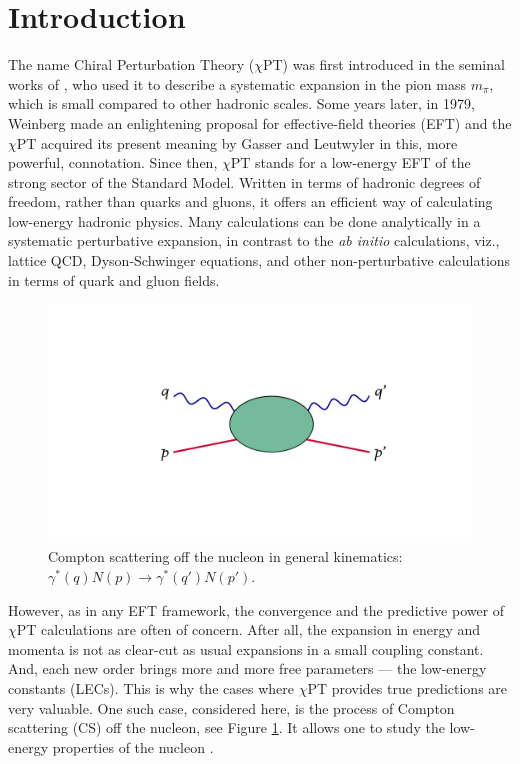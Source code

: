 \documentclass[preprints,review,accept,moreauthors,pdftex]{Definitions/mdpi}
\begin{document}
\section{Introduction}



The name Chiral Perturbation Theory ($\chi$PT) was first introduced in the seminal works of \citet{Pagels:1974se}, who used
it to describe a systematic expansion in the pion mass
$m_\pi$, which is small compared to other hadronic scales.
Some years later, in 1979, Weinberg \cite{Weinberg:1978kz} made an enlightening  proposal for effective-field theories (EFT) and
the $\chi$PT acquired its present meaning by Gasser and Leutwyler  \cite{Gasser:1983yg,Gasser:1987rb} in this, more powerful, connotation. Since then, $\chi$PT stands for a low-energy EFT of the strong sector of the Standard Model. Written in terms of hadronic degrees of freedom, rather than quarks and gluons, it offers
an efficient way of calculating low-energy hadronic physics. 
Many calculations can be done analytically in a systematic perturbative expansion, in contrast 
to the \textit{ab initio} calculations, viz., lattice QCD, Dyson-Schwinger equations, and other non-perturbative
calculations in terms of quark and gluon fields.  

\begin{figure}[t]
\centering
\includegraphics[width=5 cm]{Figures/newCSfigure.pdf}
\caption{Compton scattering off the nucleon in general kinematics: $\gamma^*(q) N(p) \rightarrow \gamma^*(q') N(p')$. \label{CSfigure}}
\end{figure} 

However, as in any EFT framework, the convergence and the predictive power of $\chi$PT calculations are often of concern.
After all, the expansion in energy and momenta is not
as clear-cut as usual expansions in a small coupling constant. And, each new order brings more and more free parameters --- the low-energy constants (LECs). This is why the
cases where $\chi$PT provides true predictions are very valuable. One such case, considered here, is the process of Compton scattering (CS) off the nucleon, see Figure \ref{CSfigure}. It allows one to study the low-energy properties of the nucleon \cite{Bernard:1991rq,Bernard:1991ru}.
\end{document}
